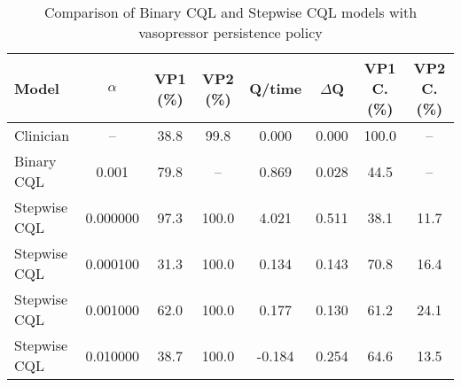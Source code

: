 \begin{table}[ht]
\centering
\caption{Comparison of Binary CQL and Stepwise CQL models with vasopressor persistence policy}
\label{tab:stepwise_comparison}
\begin{tabular}{lccccccc}
\toprule
Model & $\alpha$ & VP1 (\%) & VP2 (\%) & Q/time & $\Delta$Q & VP1 C. (\%) & VP2 C. (\%) \\
\midrule
Clinician & -- & 38.8 & 99.8 & 0.000 & 0.000 & 100.0 & -- \\
\midrule
Binary CQL & 0.001 & 79.8 & -- & 0.869 & 0.028 & 44.5 & -- \\
Stepwise CQL & 0.000000 & 97.3 & 100.0 & 4.021 & 0.511 & 38.1 & 11.7 \\
Stepwise CQL & 0.000100 & 31.3 & 100.0 & 0.134 & 0.143 & 70.8 & 16.4 \\
Stepwise CQL & 0.001000 & 62.0 & 100.0 & 0.177 & 0.130 & 61.2 & 24.1 \\
Stepwise CQL & 0.010000 & 38.7 & 100.0 & -0.184 & 0.254 & 64.6 & 13.5 \\
\bottomrule
\end{tabular}
\end{table}